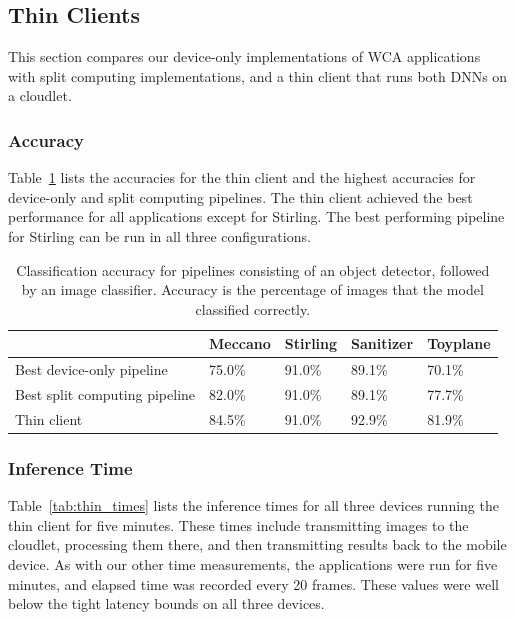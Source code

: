 \subsection{Thin Clients}\label{sec:thin_clients}

This section compares our device-only implementations of WCA applications with
split computing implementations, and a thin client that runs both DNNs on a
cloudlet.

\subsubsection{Accuracy}

Table~\ref{tab:thin_accuracy} lists the accuracies for the thin client and the
highest accuracies for device-only and split computing pipelines.
The thin client achieved the best performance for all applications except for
Stirling.
The best performing pipeline for Stirling can be run in all three
configurations.

\begin{table}
\begin{tabular}{|l||l|l|l|l|}
  \hline
  & Meccano & Stirling & Sanitizer & Toyplane\\
  \hline
  \hline
  Best device-only pipeline & 75.0\% & 91.0\% & 89.1\% & 70.1\%\\
  Best split computing pipeline & 82.0\% & 91.0\% & 89.1\% & 77.7\%\\
  Thin client & 84.5\% & 91.0\% & 92.9\% & 81.9\%\\
  \hline
\end{tabular}
  \caption{
    Classification accuracy for pipelines consisting of an object detector,
    followed by an image classifier.
    Accuracy is the percentage of images that the model classified correctly.
  }\label{tab:thin_accuracy}
\end{table}

\subsubsection{Inference Time}

Table~\ref{tab:thin_times} lists the inference times for all three devices running
the thin client for five minutes.
These times include transmitting images to the cloudlet, processing them there,
and then transmitting results back to the mobile device.
As with our other time measurements, the applications were run for five minutes,
and elapsed time was recorded every 20 frames.
These values were well below the tight latency bounds on all three devices.

